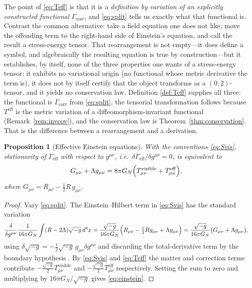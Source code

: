 \documentclass[11pt,reqno]{amsart}
\numberwithin{equation}{section}
\theoremstyle{plain}
\newtheorem{proposition}[theorem]{Proposition}
\theoremstyle{definition}
\theoremstyle{remark}
\newcommand{\Geff}{\Gamma_{\mathrm{eff}}}
\newcommand{\Gcorr}{\Gamma_{\mathrm{corr}}}
\begin{document}
The point of \eqref{eq:Teff} is that it is a \emph{definition by variation of an explicitly
constructed functional} $\Gcorr$, and \eqref{eq:split} tells us exactly what that functional
is. Contrast the common alternative: take a field equation one does not like, move the
offending term to the right-hand side of Einstein's equation, and call the result a
stress-energy tensor. That rearrangement is not empty---it does define a symbol, and
algebraically the resulting equation is true by construction---but it establishes, by itself,
none of the three properties one wants of a stress-energy tensor: it exhibits no variational
origin (no functional whose metric derivative the term is), it does not by itself certify that
the object transforms as a $(0,2)$-tensor, and it yields no conservation law. Definition
\ref{def:Teff} supplies all three: the functional is $\Gcorr$ from \eqref{eq:split}, the
tensorial transformation follows because $T^{\mathrm{eff}}$ is the metric variation of a
diffeomorphism-invariant functional (Remark~\ref{rem:invcov}), and the conservation law is
Theorem~\ref{thm:conservation}. That is the difference between a rearrangement and a
derivation.

\begin{proposition}[Effective Einstein equations]
\label{prop:einstein}
With the conventions \eqref{eq:Svis}, stationarity of $\Geff$ with respect to $g^{\mu\nu}$,
i.e.\ $\delta\Geff/\delta g^{\mu\nu}=0$, is equivalent to
\begin{equation}
\label{eq:einstein}
G_{\mu\nu}+\Lambda g_{\mu\nu}
=8\pi G_{N}\Bigl(T^{\mathrm{visible}}_{\mu\nu}+T^{\mathrm{eff}}_{\mu\nu}\Bigr),
\end{equation}
where $G_{\mu\nu}=R_{\mu\nu}-\tfrac12 R\,g_{\mu\nu}$.
\end{proposition}

\begin{proof}
Vary \eqref{eq:split}. The Einstein--Hilbert term in \eqref{eq:Svis} has the standard
variation
\[
\frac{\delta}{\delta g^{\mu\nu}}\frac{1}{16\pi G_{N}}\int(R-2\Lambda)\sqrt{-g}\,d^{4}x
=\frac{\sqrt{-g}}{16\pi G_{N}}\Bigl(R_{\mu\nu}-\tfrac12 Rg_{\mu\nu}+\Lambda g_{\mu\nu}\Bigr)
=\frac{\sqrt{-g}}{16\pi G_{N}}\bigl(G_{\mu\nu}+\Lambda g_{\mu\nu}\bigr),
\]
using $\delta\sqrt{-g}=-\tfrac12\sqrt{-g}\,g_{\mu\nu}\delta g^{\mu\nu}$ and discarding the
total-derivative term by the boundary hypothesis \cite[\S4.3]{Wald}. By \eqref{eq:Svis} and
\eqref{eq:Teff} the matter and correction terms contribute
$-\tfrac{\sqrt{-g}}{2}T^{\mathrm{visible}}_{\mu\nu}$ and
$-\tfrac{\sqrt{-g}}{2}T^{\mathrm{eff}}_{\mu\nu}$ respectively. Setting the sum to zero and
multiplying by $16\pi G_{N}/\sqrt{-g}$ gives \eqref{eq:einstein}.
\end{proof}
\end{document}
